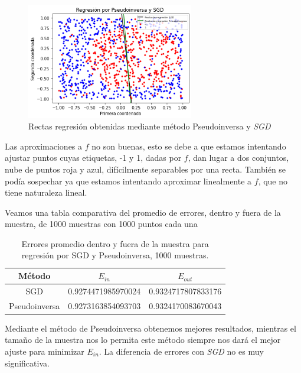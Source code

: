 \documentclass[11pt,a4paper]{article}
\theoremstyle{definition}
\begin{document}
	\fi
	\begin{figure}[H]
		\centering
		\includegraphics[width=0.65\textwidth]{images/2_3_c_bueno}
		\caption{Rectas regresión obtenidas mediante método Pseudoinversa y \textit{SGD}}
	\end{figure}
	
	Las aproximaciones a $f$ no son buenas, esto se debe a que estamos intentando ajustar puntos cuyas etiquetas, -1 y 1, dadas por $f$, dan lugar a dos conjuntos, nube de puntos roja y azul, difícilmente separables por una recta. También se podía sospechar ya que estamos intentando aproximar linealmente a $f$, que no tiene naturaleza lineal.
	
	Veamos una tabla comparativa del promedio de errores, dentro y fuera de la muestra, de 1000 muestras con 1000 puntos cada una
	
	\begin{table}[htbp]
	\begin{center}
	\begin{tabular}{|c|c|c|}
	\hline
	Método & $E_{in}$ & $E_{out}$ \\
	\hline \hline
	SGD & 0.9274471985970024 & 0.9324717807833176\\ \hline
	Pseudoinversa & 0.9273163854093703 & 0.9324170083670043\\ \hline
	\end{tabular}
	\caption{Errores promedio dentro y fuera de la muestra para regresión por SGD y Pseudoinversa, 1000 muestras.}
	\label{tabla:sencilla}
	\end{center}
	\end{table}
	
	Mediante el método de Pseudoinversa obtenemos mejores resultados, mientras el tamaño de la muestra nos lo permita este método siempre nos dará el mejor ajuste para minimizar $E_{in}$. La diferencia de errores con \textit{SGD} no es muy significativa.\\
	
\end{document}
